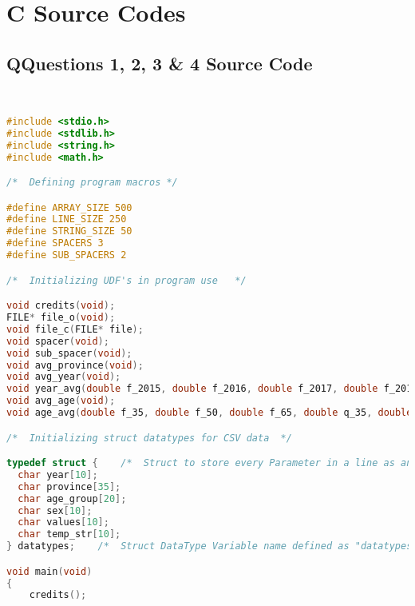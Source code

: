 \newpage

\chapter{{C Source Codes}}\label{pycode}
        
    \section{{QQuestions 1, 2, 3 & 4 Source Code}}
        
        \begin{lstlisting}[language=C, caption=\textit{CPS 188 Term Project Source Code}]


#include <stdio.h>
#include <stdlib.h>
#include <string.h>
#include <math.h>

/*  Defining program macros */

#define ARRAY_SIZE 500
#define LINE_SIZE 250
#define STRING_SIZE 50
#define SPACERS 3
#define SUB_SPACERS 2

/*  Initializing UDF's in program use   */

void credits(void);
FILE* file_o(void);
void file_c(FILE* file);
void spacer(void);
void sub_spacer(void);
void avg_province(void);
void avg_year(void);
void year_avg(double f_2015, double f_2016, double f_2017, double f_2018, double f_2019, double f_2020, double f_2021, double q_2015, double q_2016, double q_2017, double q_2018, double q_2019, double q_2020, double q_2021, double o_2015, double o_2016, double o_2017, double o_2018, double o_2019, double o_2020, double o_2021, double a_2015, double a_2016, double a_2017, double a_2018, double a_2019, double a_2020, double a_2021, double b_2015, double b_2016, double b_2017, double b_2018, double b_2019, double b_2020, double b_2021);
void avg_age(void);
void age_avg(double f_35, double f_50, double f_65, double q_35, double q_50, double q_65, double o_35, double o_50, double o_65, double a_35, double a_50, double a_65, double b_35, double b_50, double b_65);

/*  Initializing struct datatypes for CSV data  */

typedef struct {    /*  Struct to store every Parameter in a line as an array of tokens with respect to their induvidual fields */
  char year[10];
  char province[35];
  char age_group[20];
  char sex[10];
  char values[10];
  char temp_str[10];
} datatypes;    /*  Struct DataType Variable name defined as "datatypes"    */

void main(void)
{
	credits();


\end{lstlisting}
